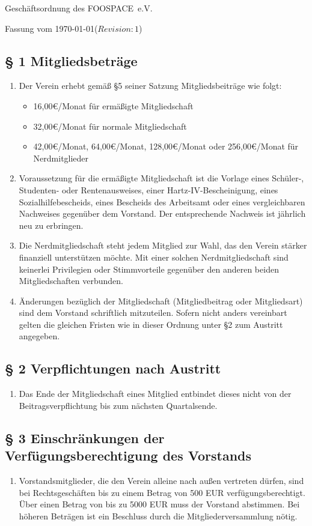 \documentclass[10pt,a4paper]{article}
\newcommand{\name}{FOOSPACE}
\newcommand{\revision}{$Revision: 1$}
\begin{document}
{\LARGE Geschäftsordnung des \name\ e.V.}

Fassung vom \today (\revision)

\subsection*{§ 1 Mitgliedsbeträge}
\begin{enumerate}
\item Der Verein erhebt gemäß §5 seiner Satzung Mitgliedsbeiträge wie folgt:
	\begin{itemize}
	\item 16,00€/Monat für ermäßigte Mitgliedschaft
	\item 32,00€/Monat für normale Mitgliedschaft
	\item 42,00€/Monat, 64,00€/Monat, 128,00€/Monat oder 256,00€/Monat für Nerdmitglieder
	\end{itemize}
\item Voraussetzung für die ermäßigte Mitgliedschaft ist die Vorlage eines
	Schüler-, Studenten- oder Rentenausweises, einer Hartz-IV-Bescheinigung,
	eines Sozialhilfebescheids, eines Bescheids des Arbeitsamt
	oder eines vergleichbaren Nachweises gegenüber dem Vorstand.
	Der entsprechende Nachweis ist jährlich neu zu erbringen.
\item Die Nerdmitgliedschaft steht jedem Mitglied zur Wahl, das den Verein stärker
	finanziell unterstützen möchte. Mit einer solchen
	Nerdmitgliedschaft sind keinerlei Privilegien oder Stimmvorteile gegenüber
	den anderen beiden Mitgliedschaften verbunden.
\item Änderungen bezüglich der Mitgliedschaft (Mitgliedbeitrag oder Mitgliedsart)
	sind dem Vorstand schriftlich mitzuteilen. Sofern nicht anders
	vereinbart gelten die gleichen Fristen wie in dieser Ordnung unter §2
	zum Austritt angegeben.
\end{enumerate}

\subsection*{§ 2 Verpflichtungen nach Austritt}
\begin{enumerate}
\item Das Ende der Mitgliedschaft eines Mitglied entbindet dieses nicht von der
	Beitragsverpflichtung bis zum nächsten Quartalsende.
\end{enumerate}

\subsection*{§ 3 Einschränkungen der Verfügungsberechtigung des Vorstands}
\begin{enumerate}
\item Vorstandsmitglieder, die den Verein alleine nach außen vertreten
    dürfen, sind bei Rechtsgeschäften bis zu einem Betrag von 500 EUR
    verfügungsberechtigt. Über einen Betrag von bis zu 5000 EUR muss der
    Vorstand abstimmen. Bei höheren Beträgen ist ein Beschluss durch die
    Mitgliederversammlung nötig.
\end{enumerate}
\end{document}
